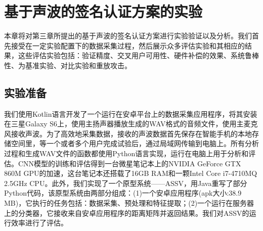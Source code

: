 \chapter{基于声波的签名认证方案的实验}
本章将对第三章所提出的基于声波的签名认证方案进行实验验证以及分析。我们首先接受在一定实验配置下的数据采集过程，然后展示众多评估实验和其相应的结果，这些评估实验包括：验证精度、交叉用户可用性、硬件补偿的效果、系统鲁棒性、为基准实验、对比实验和重放攻击。

\section{实验准备}
我们使用Kotlin语言开发了一个运行在安卓平台上的数据采集应用程序，将其安装在三星Galaxy S6上，使用主扬声器播放生成的WAV格式的音频文件，使用主麦克风接收声波。为了高效地采集数据，接收的声波数据首先保存在智能手机的本地存储空间里，等一个或者多个用户完成试验后，通过局域网传输到电脑上。所有分析过程和生成WAV文件的函数都使用Python语言实现，运行在电脑上用于分析和评估。CNN模型的训练和评估得到一台微星笔记本上的NVIDIA GeForce GTX 860M GPU的加速，这台笔记本还搭载了16GB RAM和一颗Intel Core i7-4710MQ 2.5GHz CPU。此外，我们实现了一个原型系统——ASSV，用Java重写了部分Python代码，该原型系统由两部分组成：(1)一个安卓应用程序(apk大小:38.9 MB)，它执行的任务包括：数据采集、预处理和特征提取；(2)一个运行在服务器上的分类器，它接收来自安卓应用程序的距离矩阵并返回结果。我们对ASSV的运行效率进行了评估。

